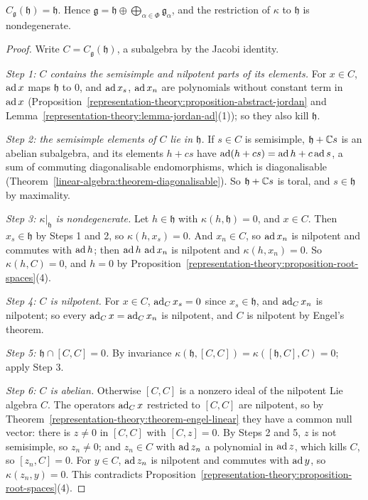 \begin{theorem}\label{representation-theory:theorem-centraliser-cartan}
$C_{\mathfrak{g}}(\mathfrak{h}) = \mathfrak{h}$. Hence $\mathfrak{g} = \mathfrak{h} \oplus \bigoplus_{\alpha \in \Phi}\mathfrak{g}_\alpha$, and the restriction of $\kappa$ to
$\mathfrak{h}$ is nondegenerate.
\end{theorem}

\begin{proof}
Write $C = C_{\mathfrak{g}}(\mathfrak{h})$, a subalgebra by the Jacobi identity.

\emph{Step 1: $C$ contains the semisimple and nilpotent parts of its elements.} For $x \in C$, $\operatorname{ad} x$ maps $\mathfrak{h}$ to $0$, and $\operatorname{ad} x_s$, $\operatorname{ad} x_n$ are polynomials without
constant term in $\operatorname{ad} x$ (Proposition~\ref{representation-theory:proposition-abstract-jordan} and Lemma~\ref{representation-theory:lemma-jordan-ad}(1)); so they also kill
$\mathfrak{h}$.

\emph{Step 2: the semisimple elements of $C$ lie in $\mathfrak{h}$.} If $s \in C$ is semisimple, $\mathfrak{h} + \mathbb{C} s$ is an abelian subalgebra, and its elements $h + cs$ have
$\operatorname{ad}(h + cs) = \operatorname{ad} h + c\operatorname{ad} s$, a sum of commuting diagonalisable endomorphisms, which is diagonalisable (Theorem~\ref{linear-algebra:theorem-diagonalisable}). So $\mathfrak{h} + \mathbb{C} s$ is
toral, and $s \in \mathfrak{h}$ by maximality.

\emph{Step 3: $\kappa|_{\mathfrak{h}}$ is nondegenerate.} Let $h \in \mathfrak{h}$ with $\kappa(h, \mathfrak{h}) = 0$, and $x \in C$. Then $x_s \in \mathfrak{h}$ by Steps 1 and 2, so
$\kappa(h, x_s) = 0$. And $x_n \in C$, so $\operatorname{ad} x_n$ is nilpotent and commutes with $\operatorname{ad} h$; then $\operatorname{ad} h\,\operatorname{ad} x_n$ is nilpotent and $\kappa(h, x_n) = 0$. So $\kappa(h, C) = 0$, and
$h = 0$ by Proposition~\ref{representation-theory:proposition-root-spaces}(4).

\emph{Step 4: $C$ is nilpotent.} For $x \in C$, $\operatorname{ad}_Cx_s = 0$ since $x_s \in \mathfrak{h}$, and $\operatorname{ad}_Cx_n$ is nilpotent; so every $\operatorname{ad}_Cx = \operatorname{ad}_Cx_n$ is nilpotent, and $C$ is
nilpotent by Engel's theorem.

\emph{Step 5: $\mathfrak{h} \cap [C, C] = 0$.} By invariance $\kappa(\mathfrak{h}, [C, C]) = \kappa([\mathfrak{h}, C], C) = 0$; apply Step 3.

\emph{Step 6: $C$ is abelian.} Otherwise $[C, C]$ is a nonzero ideal of the nilpotent Lie algebra $C$. The operators $\operatorname{ad}_Cx$ restricted to $[C, C]$ are nilpotent, so by
Theorem~\ref{representation-theory:theorem-engel-linear} they have a common null vector: there is $z \neq 0$ in $[C, C]$ with $[C, z] = 0$. By Steps 2 and 5, $z$ is not semisimple,
so $z_n \neq 0$; and $z_n \in C$ with $\operatorname{ad} z_n$ a polynomial in $\operatorname{ad} z$, which kills $C$, so $[z_n, C] = 0$. For $y \in C$, $\operatorname{ad} z_n$ is nilpotent and commutes with $\operatorname{ad} y$, so
$\kappa(z_n, y) = 0$. This contradicts Proposition~\ref{representation-theory:proposition-root-spaces}(4).


\end{proof}
